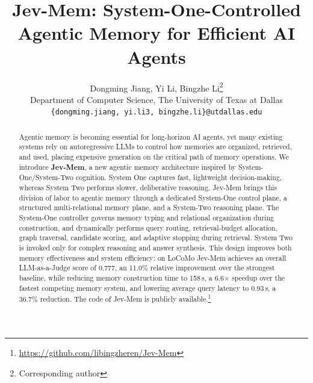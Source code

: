 \documentclass[11pt]{article}
\title{Jev-Mem: System-One-Controlled Agentic Memory for Efficient AI Agents}
\author{
Dongming Jiang, Yi Li, Bingzhe Li\thanks{Corresponding author} \\
Department of Computer Science, The University of Texas at Dallas \\
\texttt{\{dongming.jiang, yi.li3, bingzhe.li\}@utdallas.edu} 
}
\newcommand{\method}{Jev-Mem}
\begin{document}
\maketitle
\begin{abstract}
Agentic memory is becoming essential for long-horizon AI agents, yet many existing systems rely on autoregressive LLMs to control how memories are organized, retrieved, and used, placing expensive generation on the critical path of memory operations. We introduce \textbf{\method}, a new agentic memory architecture inspired by System-One/System-Two cognition. System One captures fast, lightweight decision-making, whereas System Two performs slower, deliberative reasoning. Jev-Mem brings this division of labor to agentic memory through a dedicated System-One control plane, a structured multi-relational memory plane, and a System-Two reasoning plane. The System-One controller governs memory typing and relational organization during construction, and dynamically performs query routing, retrieval-budget allocation, graph traversal, candidate scoring, and adaptive stopping during retrieval. System Two is invoked only for complex reasoning and answer synthesis. This design improves both memory effectiveness and system efficiency: on LoCoMo Jev-Mem achieves an overall LLM-as-a-Judge score of 0.777, an 11.0\% relative improvement over the strongest baseline, while reducing memory construction time to 158\,s, a 6.6$\times$ speedup over the fastest competing memory system, and lowering average query latency to 0.93\,s, a 36.7\% reduction. The code of Jev-Mem is publicly available.\footnote{\url{https://github.com/libingzheren/Jev-Mem}}

\end{abstract}
\end{document}
